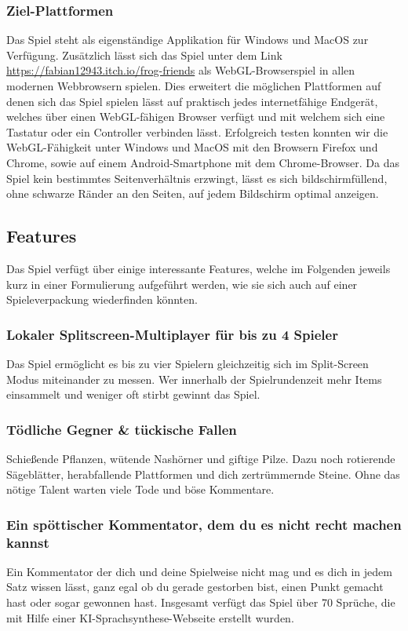 \subsubsection*{Ziel-Plattformen}
Das Spiel steht als eigenständige Applikation für Windows und MacOS zur Verfügung. Zusätzlich lässt sich das Spiel unter dem Link \url{https://fabian12943.itch.io/frog-friends} als WebGL-Browserspiel in allen modernen Webbrowsern spielen. Dies erweitert die möglichen Plattformen auf denen sich das Spiel spielen lässt auf praktisch jedes internetfähige Endgerät, welches über einen WebGL-fähigen Browser verfügt und mit welchem sich eine Tastatur oder ein Controller verbinden lässt. Erfolgreich testen konnten wir die WebGL-Fähigkeit unter Windows und MacOS mit den Browsern Firefox und Chrome, sowie auf einem Android-Smartphone mit dem Chrome-Browser. Da das Spiel kein bestimmtes Seitenverhältnis erzwingt, lässt es sich bildschirmfüllend, ohne schwarze Ränder an den Seiten, auf jedem Bildschirm optimal anzeigen. 

\subsection{Features}

Das Spiel verfügt über einige interessante Features, welche im Folgenden jeweils kurz in einer Formulierung aufgeführt werden, wie sie sich auch auf einer Spieleverpackung wiederfinden könnten.

\subsubsection*{Lokaler Splitscreen-Multiplayer für bis zu 4 Spieler}
Das Spiel ermöglicht es bis zu vier Spielern gleichzeitig sich im Split-Screen Modus miteinander zu messen. Wer innerhalb der Spielrundenzeit mehr Items einsammelt und weniger oft stirbt gewinnt das Spiel.

\subsubsection*{Tödliche Gegner \& tückische Fallen}
Schießende Pflanzen, wütende Nashörner und giftige Pilze. Dazu noch rotierende Sägeblätter, herabfallende Plattformen und dich zertrümmernde Steine. Ohne das nötige Talent warten viele Tode und böse Kommentare. 

\subsubsection*{Ein spöttischer Kommentator, dem du es nicht recht machen kannst}
Ein Kommentator der dich und deine Spielweise nicht mag und es dich in jedem Satz wissen lässt, ganz egal ob du gerade gestorben bist, einen Punkt gemacht hast oder sogar gewonnen hast. Insgesamt verfügt das Spiel über 70 Sprüche, die mit Hilfe einer KI-Sprachsynthese-Webseite erstellt wurden.

